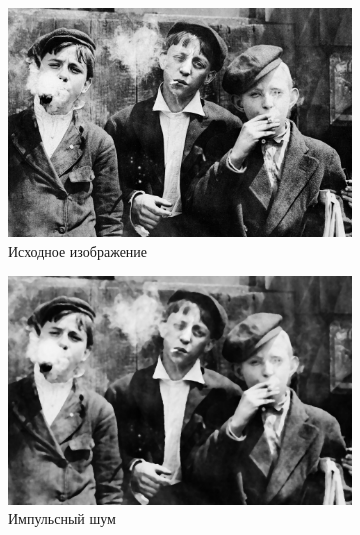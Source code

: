 \begin{figure}[ht] 
    \centering
    \begin{subfigure}[b]{0.5\linewidth}
        \centering
        \includegraphics[width=0.95\linewidth]{../lewis-hine-taschen-main-3.jpg} 
        \caption{Исходное изображение} 
        \label{median_7:a} 
        \vspace{4ex}
    \end{subfigure}%
    \begin{subfigure}[b]{0.5\linewidth}
      \centering
      \includegraphics[width=0.95\linewidth]{../Median_FIlter/Median_Impulse_noise_(k=7).jpg} 
      \caption{Импульсный шум} 
      \label{median_7:b} 
      \vspace{4ex}
    \end{subfigure}
    \begin{subfigure}[b]{0.5\linewidth}
      \centering

\end{subfigure}
\end{figure}
